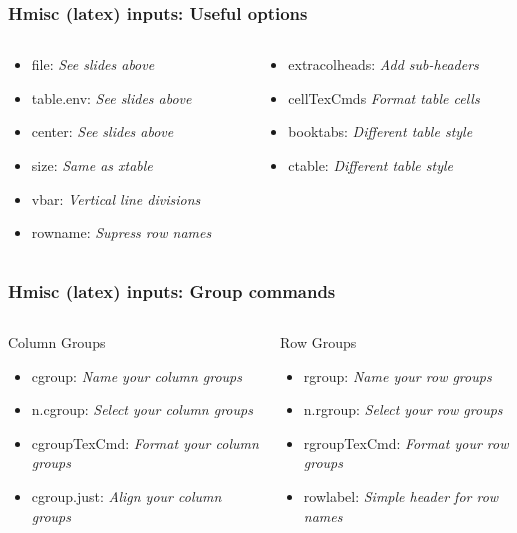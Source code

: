 \documentclass[nogin]{beamer}\usepackage[]{graphicx}\usepackage[]{color}
\begin{document}
\begin{frame}
\frametitle{Hmisc (latex) inputs: Useful options}
\small
\begin{columns}[T]
\begin{column}{.5\textwidth}
\begin{itemize}
\item file: \emph{See slides above}
\item table.env: \emph{See slides above}
\item center: \emph{See slides above}
\item size: \emph{Same as xtable}
\item vbar: \emph{Vertical line divisions}
\item rowname: \emph{Supress row names}
\end{itemize}
\end{column}
\begin{column}{.5\textwidth}
\begin{itemize}
\item extracolheads: \emph{Add sub-headers}
\item cellTexCmds \emph{Format table cells}
\item booktabs: \emph{Different table style}
\item ctable: \emph{Different table style}
\end{itemize}
\end{column}
\end{columns}
\end{frame}

\begin{frame}
\frametitle{Hmisc (latex) inputs: Group commands}
\small
\begin{columns}[T]
\begin{column}{.5\textwidth}
\begin{block}{Column Groups}
\begin{itemize}
\item cgroup: \emph{Name your column groups}
\item n.cgroup: \emph{Select your column groups}
\item cgroupTexCmd: \emph{Format your column groups}
\item cgroup.just: \emph{Align your column groups}
\end{itemize}
\end{block}
\end{column}
\begin{column}{.5\textwidth}
\begin{block}{Row Groups}
\begin{itemize}
\item rgroup: \emph{Name your row groups}
\item n.rgroup: \emph{Select your row groups}
\item rgroupTexCmd: \emph{Format your row groups}
\item rowlabel: \emph{Simple header for row names}
\end{itemize}
\end{block}
\end{column}
\end{columns}
\end{frame}
\end{document}
